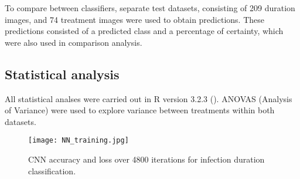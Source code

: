 \documentclass[../../Paper.tex]{subfiles}
\begin{document}
To compare between classifiers, separate test datasets, consisting of 209 duration images, and 74 treatment images were used to obtain predictions. These predictions consisted of a predicted class and a percentage of certainty, which were also used in comparison analysis. 


\subsection*{Statistical analysis}

All statistical analses were carried out in R version 3.2.3 (\cite{r_core_team_r:_2013}).
ANOVAS (Analysis of Variance) were used to explore variance between treatments within both datasets.





\begin{figure}[!b]
\centering
\texttt{[image: NN\_training.jpg]}
\caption{CNN accuracy and loss over 4800 iterations for infection duration classification.}
\end{figure}
\end{document}
